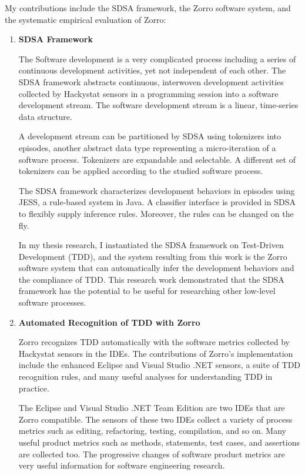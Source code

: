 My contributions include the SDSA framework, the Zorro software system, and the systematic empirical evaluation of Zorro:
\begin{enumerate}
\item \textbf{SDSA Framework}

The Software development is a very complicated process including a series of continuous development activities, yet not independent of each other. The SDSA framework abstracts continuous, interwoven development activities collected by Hackystat sensors in a programming session into a software development stream. The software development stream is a linear, time-series data structure. 

A development stream can be partitioned by SDSA using tokenizers into episodes, another abstract data type representing a micro-iteration of a software process. Tokenizers are expandable and selectable. A different set of tokenizers can be applied according to the studied software process.

The SDSA framework characterizes development behaviors in episodes using JESS, a rule-based system in Java. A classifier interface is provided in SDSA to flexibly supply inference rules. Moreover, the rules can be changed on the fly. 

In my thesis research, I instantiated the SDSA framework on Test-Driven Development (TDD), and the system resulting from this work is the Zorro software system that can automatically infer the development behaviors and the compliance of TDD. This research work demonstrated that the SDSA framework has the potential to be useful for researching other low-level software processes. 

\item \textbf{Automated Recognition of TDD with Zorro}

Zorro recognizes TDD automatically with the software metrics collected by Hackystat sensors in the IDEs. The contributions of Zorro's implementation include the enhanced Eclipse and Visual Studio .NET sensors, a suite of TDD recognition rules, and many useful analyses for understanding TDD in practice.

The Eclipse and Visual Studio .NET Team Edition are two IDEs that are Zorro compatible. The sensors of these two IDEs collect a variety of process metrics such as editing, refactoring, testing, compilation, and so on. Many useful product metrics such as methods, statements, test cases, and assertions are collected too. The progressive changes of software product metrics are very useful information for software engineering research.


\end{enumerate}
